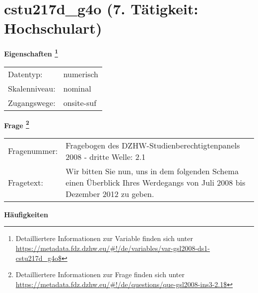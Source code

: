 
    \setcounter{footnote}{0}

    \vspace*{-1.8cm}
	\section{cstu217d\_g4o (7. Tätigkeit: Hochschulart)}
	\label{section:cstu217d_g4o}



    \vspace*{0.5cm}
    \noindent\textbf{Eigenschaften
	\footnote{Detailliertere Informationen zur Variable finden sich unter
		\url{https://metadata.fdz.dzhw.eu/\#!/de/variables/var-gsl2008-ds1-cstu217d_g4o$}}}\\
	\begin{tabularx}{\hsize}{@{}lX}
	Datentyp: & numerisch \\
	Skalenniveau: & nominal \\
	Zugangswege: &
	  onsite-suf
 \\
    \end{tabularx}



				\vspace*{0.5cm}
                \noindent\textbf{Frage
	                \footnote{Detailliertere Informationen zur Frage finden sich unter
		              \url{https://metadata.fdz.dzhw.eu/\#!/de/questions/que-gsl2008-ins3-2.1$}}}\\
				\begin{tabularx}{\hsize}{@{}lX}
					Fragenummer: &
					  Fragebogen des DZHW-Studienberechtigtenpanels 2008 - dritte Welle:
					  2.1
 \\
					Fragetext: & Wir bitten Sie nun, uns in dem folgenden Schema einen Überblick Ihres Werdegangs von Juli 2008 bis Dezember 2012 zu geben. \\
				\end{tabularx}





        		\vspace*{0.5cm}
                \noindent\textbf{Häufigkeiten}

